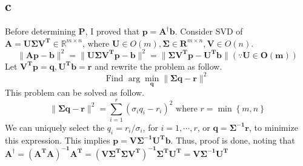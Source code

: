 \documentclass[10pt]{article}
\begin{document}
\subsection*{c}
Before determining $\mathbf{P}$, I proved that $\mathbf{p} = \mathbf{A}^\dagger \mathbf{b}$.
Consider SVD of $\mathbf{A = U\Sigma V^T} \in \mathbb{R}^{m\times n}$, where $\mathbf{U}\in O(m), \mathbf{\Sigma} \in \mathbf{R}^{m\times n}, \mathbf{V} \in O(n)$.
\begin{equation}
    \lVert \mathbf{Ap-b} \rVert^2 = \lVert \mathbf{U\Sigma V^Tp-b} \rVert^2 = \lVert \mathbf{\Sigma V^Tp - U^Tb} \rVert (\because \mathbf{U \in O(m)})
\end{equation}
Let $\mathbf{V^Tp = q}, \mathbf{U^Tb = r}$ and rewrite the problem as follow.
\begin{equation}
    \text{Find } \arg\min_{\mathbf{q}} \lVert \mathbf{\Sigma q} - \mathbf{r}\rVert^2
\end{equation}
This problem can be solved as follow.
\begin{equation}
    \lVert \mathbf{\Sigma q - r}\rVert^2 = \sum_{i=1}^r (\sigma_iq_i - r_i)^2 \text{ where } r = \min \left\{m,n\right\}
\end{equation}
We can uniquely select the $q_i = r_i/\sigma_i$, for $i = 1,\cdots, r$, or $\mathbf{q = \Sigma^{-1}\mathbf{r}}$, to minimize this expression.
This implies $\mathbf{p = V\Sigma^{-1}U^Tb}$. Thus, proof is done, noting that $\mathbf{A^\dagger = (A^TA)^{-1}A^T = (V\Sigma^T\Sigma V^T)^{-1}\Sigma^TU^T = V\Sigma^{-1}U^T}$
\end{document}
